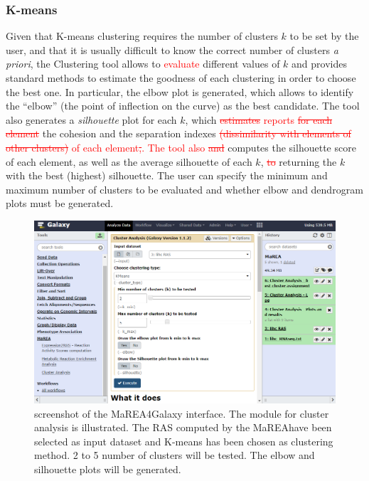 \documentclass[preprint,12pt,authoryear]{elsarticle}
\newcommand{\red}{\textcolor{red}}
\newcommand{\mareagalaxy}{\textsf{MaREA4Galaxy}}
\newcommand{\mareaTool}{\textsf{MaREA}}
\newcommand{\clusterTool}{\textsf{Clustering}}
\begin{document}
\subsubsection{K-means}

Given that K-means clustering requires the number of clusters $k$ to
be set by the user, and that it is usually difficult to know the
correct number of clusters \textit{a priori}, the \clusterTool{} tool
allows to \red{evaluate} different values of $k$ and provides standard
methods to estimate the goodness of each clustering in order to choose
the best one. In particular, the elbow plot is generated, which allows
to identify the ``elbow'' (the point of inflection on the curve) as
the best candidate. The tool also generates a \emph{silhouette} plot
for each $k$, which \red{\sout{estimates} reports} \red{\sout{for each
    element}} the cohesion and the separation indexes
\red{\sout{(dissimilarity with elements of other clusters)} of each
  element}\red{\sout{,}. The tool also \sout{and}} computes the
silhouette score of each element, as well as the average silhouette of
each $k$, \red{\sout{to}} returning the $k$ with the best (highest)
silhouette.  The user can specify the minimum and maximum number of
clusters to be evaluated and whether elbow and dendrogram plots must
be generated.

\begin{figure}[ht]
  \includegraphics[width=1\textwidth]{figs/screenshot2v2q.png}
  \caption{screenshot of the \mareagalaxy{} interface. The module for
    cluster analysis is illustrated. The RAS computed  by the
    \mareaTool have been selected as input dataset and K-means has
    been chosen as clustering method. 2 to 5 number of clusters will
    be tested. The elbow and silhouette plots will be generated.}
  \label{fig:screenshot2}
\end{figure}
\end{document}
